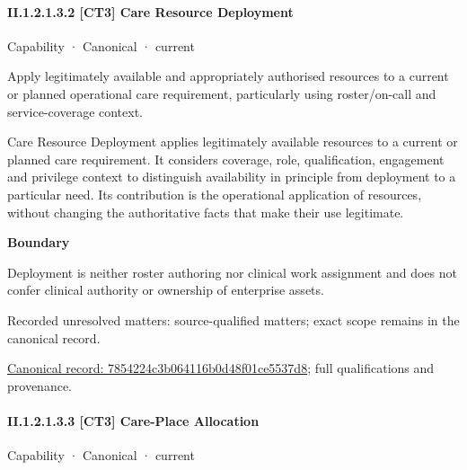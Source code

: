 \paragraph*{II.1.2.1.3.2 [CT3] Care Resource Deployment}
\label{navigation:II.1.2.1.3.2}

\label{element:7854224c3b064116b0d48f01ce5537d8}
{\small Capability · Canonical · current}\par

Apply legitimately available and appropriately authorised resources to a current or planned operational care requirement, particularly using roster/on-call and service-coverage context.



Care Resource Deployment applies legitimately available resources to a current or planned care requirement. It considers coverage, role, qualification, engagement and privilege context to distinguish availability in principle from deployment to a particular need. Its contribution is the operational application of resources, without changing the authoritative facts that make their use legitimate.



\textbf{Boundary}



Deployment is neither roster authoring nor clinical work assignment and does not confer clinical authority or ownership of enterprise assets.


{\small Recorded unresolved matters: source-qualified matters; exact scope remains in the canonical record.}\par
{\footnotesize \href{../../../../continuum/strategy/capability/7854224c3b064116b0d48f01ce5537d8.md}{Canonical record: 7854224c3b064116b0d48f01ce5537d8}; full qualifications and provenance.}\par
\paragraph*{II.1.2.1.3.3 [CT3] Care-Place Allocation}
\label{navigation:II.1.2.1.3.3}

\label{element:f8a4df47bea742a0869802472136d55f}
{\small Capability · Canonical · current}\par

